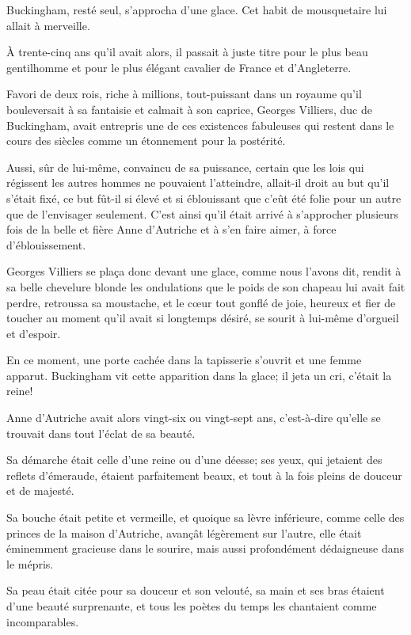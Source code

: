 Buckingham, resté seul, s'approcha d'une glace. Cet habit de mousquetaire lui allait à merveille. 

À trente-cinq ans qu'il avait alors, il passait à juste titre pour le plus beau gentilhomme et pour le plus élégant cavalier de France et d'Angleterre. 

Favori de deux rois, riche à millions, tout-puissant dans un royaume qu'il bouleversait à sa fantaisie et calmait à son caprice, Georges Villiers, duc de Buckingham, avait entrepris une de ces existences fabuleuses qui restent dans le cours des siècles comme un étonnement pour la postérité. 

Aussi, sûr de lui-même, convaincu de sa puissance, certain que les lois qui régissent les autres hommes ne pouvaient l'atteindre, allait-il droit au but qu'il s'était fixé, ce but fût-il si élevé et si éblouissant que c'eût été folie pour un autre que de l'envisager seulement. C'est ainsi qu'il était arrivé à s'approcher plusieurs fois de la belle et fière Anne d'Autriche et à s'en faire aimer, à force d'éblouissement. 

Georges Villiers se plaça donc devant une glace, comme nous l'avons dit, rendit à sa belle chevelure blonde les ondulations que le poids de son chapeau lui avait fait perdre, retroussa sa moustache, et le cœur tout gonflé de joie, heureux et fier de toucher au moment qu'il avait si longtemps désiré, se sourit à lui-même d'orgueil et d'espoir. 

En ce moment, une porte cachée dans la tapisserie s'ouvrit et une femme apparut. Buckingham vit cette apparition dans la glace; il jeta un cri, c'était la reine! 

Anne d'Autriche avait alors vingt-six ou vingt-sept ans, c'est-à-dire qu'elle se trouvait dans tout l'éclat de sa beauté. 

Sa démarche était celle d'une reine ou d'une déesse; ses yeux, qui jetaient des reflets d'émeraude, étaient parfaitement beaux, et tout à la fois pleins de douceur et de majesté. 

Sa bouche était petite et vermeille, et quoique sa lèvre inférieure, comme celle des princes de la maison d'Autriche, avançât légèrement sur l'autre, elle était éminemment gracieuse dans le sourire, mais aussi profondément dédaigneuse dans le mépris. 

Sa peau était citée pour sa douceur et son velouté, sa main et ses bras étaient d'une beauté surprenante, et tous les poètes du temps les chantaient comme incomparables. 

